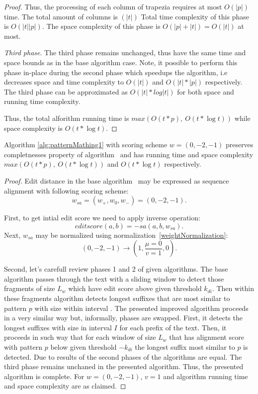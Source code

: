 \begin{proof}
Thus, the processing of each column of trapezia requires at most $O(|p|)$ time. The total amount of columns is $(|t|)$
Total time complexity of this phase is $O(|t||p|)$.
The space complexity of this phase is $O(|p|+|t|)=O(|t|)$ at most.

\emph{Third phase}.
The third phase remains unchanged, thus have the same time and space bounds as in the base algorithm case.
Note, it possible to perform this phase in-place during the second phase which speedups the algorithm, i.e decreases space and time complexity to $O(|t|)$ and $O(|t|*|p|)$ respectively.
The third phase can be approximated as $O(|t| * log|t|)$ for both space and running time complexity.

Thus, the total alforithm running time is $max(O(t * p),\ O(t * \log t))$ while space complexity is $O(t * \log t)$.
\end{proof}

\begin{theorem}
Algorithm \ref{alg:patternMathing1} with scoring scheme $w = (0,-2,-1)$ preserves completnesses property of algorithm~\cite{luciv2019interactive} and has running time and space complexity $max(O(t*p),\ O(t* \log t))$ and $O(t *  \log t)$  respectively.
\end{theorem}

\begin{proof}
Edit distance in the base algorithm~\cite{.} may be expressed as sequence alignment with following scoring scheme: 
$$w_{sa}=(w_{+},w_{0},w_{-}) = (0,-2,-1).$$

First, to get intial edit score we need to apply inverse operation:
$$editscore(a,b) = -sa(a,b,w_{sa}).$$
Next, $w_{sa}$ may be normalized using normalization~\ref{weightNormalization}:
$$(0, -2, -1) \rightarrow (1,\frac{\mu=0}{v=1}, 0).$$

Second, let's carefull review phases 1 and 2 of given algorithms.
The base algorithm passes through the text with a sliding window to detect those fragments of size $L_{w}$ which have edit score above given threshold $k_{di}$.
Then within these fragments algorithm detects longest suffixes that are most similar to pattern $p$ with size within interval .
The presented improved algorithm proceeds in a very similar way but, informally, phases are swapped.
First, it detects the longest suffixes with size in interval $I$ for each prefix of the text.
Then, it proceeds in such way that for each window of size $L_{w}$ that has alignment score with pattern $p$ below given threshold $-k_{di}$  the longest suffix most similar to $p$ is detected.
Due to  results of the second phases of the algorithms are equal.
The third phase remains unchaned in the presented algorithm.
Thus, the presented algorithm is complete.
For $w = (0,-2,-1)$, $v=1$ and algorithm running time and space complexity are as claimed.
\end{proof}

